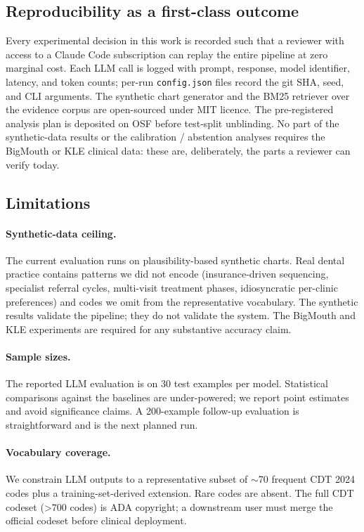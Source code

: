 \documentclass[preprint,authoryear,1p,12pt]{elsarticle}
\begin{document}
\subsection{Reproducibility as a first-class outcome}

Every experimental decision in this work is recorded such that a
reviewer with access to a Claude Code subscription can replay the entire
pipeline at zero marginal cost. Each LLM call is logged with prompt,
response, model identifier, latency, and token counts; per-run
\texttt{config.json} files record the git SHA, seed, and CLI arguments.
The synthetic chart generator and the BM25 retriever over the evidence
corpus are open-sourced under MIT licence. The pre-registered analysis
plan is deposited on OSF before test-split unblinding. No part of the
synthetic-data results or the calibration / abstention analyses
requires the BigMouth or KLE clinical data: these are, deliberately,
the parts a reviewer can verify today.

\subsection{Limitations}

\paragraph{Synthetic-data ceiling.} The current evaluation runs on
plausibility-based synthetic charts. Real dental practice contains
patterns we did not encode (insurance-driven sequencing, specialist
referral cycles, multi-visit treatment phases, idiosyncratic per-clinic
preferences) and codes we omit from the representative vocabulary. The
synthetic results validate the pipeline; they do not validate the
system. The BigMouth and KLE experiments are required for any
substantive accuracy claim.

\paragraph{Sample sizes.} The reported LLM evaluation is on 30 test
examples per model. Statistical comparisons against the baselines are
under-powered; we report point estimates and avoid significance claims.
A 200-example follow-up evaluation is straightforward and is the next
planned run.

\paragraph{Vocabulary coverage.} We constrain LLM outputs to a
representative subset of $\sim$70 frequent CDT 2024 codes plus a
training-set-derived extension. Rare codes are absent. The full CDT
codeset (\textgreater $700$ codes) is ADA copyright; a downstream user
must merge the official codeset before clinical deployment.
\end{document}
